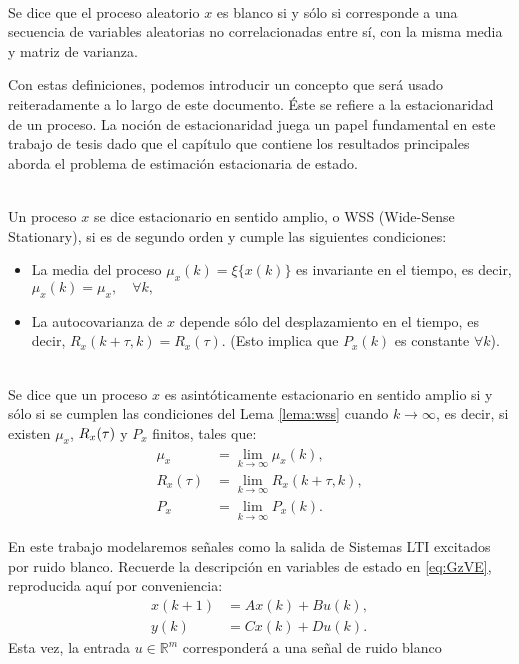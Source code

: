 \begin{defin}{\ \\}
Se dice que el proceso aleatorio $x$ es blanco si y s\'olo si corresponde a una secuencia de variables aleatorias no correlacionadas entre s\'i, con la misma media y matriz de varianza.
\end{defin}

Con estas definiciones, podemos introducir un concepto que ser\'a usado reiteradamente a lo largo de este documento. \'Este se refiere a la estacionaridad de un proceso. La noci\'on de estacionaridad juega un papel fundamental en este trabajo de tesis dado que el cap\'itulo que contiene los resultados principales aborda el problema de estimaci\'on estacionaria de estado.

\begin{lema}\label{lema:wss}{\ \\}
Un proceso $x$ se dice estacionario en sentido amplio, o WSS (Wide-Sense Stationary), si es de segundo orden y cumple las siguientes condiciones:
\begin{itemize}
\item La media del proceso $\mu_x(k)=\xi\{ x(k)\}$ es invariante en el tiempo, es decir, $\mu_x(k)=\mu_x,\quad \forall k,$
\item La autocovarianza de $x$ depende s\'olo del desplazamiento en el tiempo, es decir, $R_x(k+\tau,k)=R_x(\tau)$. (Esto implica que $P_x(k)$ es constante $\forall k$).
\end{itemize}\QED
\end{lema}

\begin{defin}{\ \\}
Se dice que un proceso $x$ es asint\'oticamente estacionario en sentido amplio si y s\'olo si se cumplen las condiciones del Lema \ref{lema:wss} cuando $k\rightarrow \infty$, es decir, si existen $\mu_x$,$ \hspace{1mm} R_x(\tau)$ y $P_x$ finitos, tales que:
\begin{align*}
\mu_x &=\lim_{k\rightarrow \infty}{\mu_x(k)},\\
R_{x}(\tau)&=\lim_{k\rightarrow \infty}{R_x(k+\tau,k)},\\
P_x&=\lim_{k\rightarrow \infty}{P_x(k)}.
\end{align*}
\end{defin}

En este trabajo modelaremos se\~nales como la salida de Sistemas LTI excitados por ruido blanco. Recuerde la descripci\'on en variables de estado en \eqref{eq:GzVE}, reproducida aqu\'i por conveniencia:
\begin{subequations}\label{eq:GzVEal}
\begin{align}
x(k+1)&=Ax(k)+Bu(k),\\
y(k)&=Cx(k)+Du(k).
\end{align}
\end{subequations}
Esta vez, la entrada $u \in \mathbb{R}^m$ corresponder\'a a una se\~nal de ruido blanco

